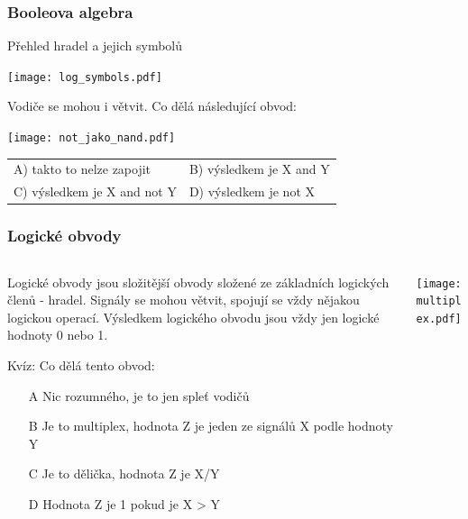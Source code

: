 \documentclass{beamer}
\begin{document}
\begin{frame}
\frametitle{Booleova algebra}

Přehled hradel a jejich symbolů
\begin{center}
   \texttt{[image: log\_symbols.pdf]}
\end{center}

Vodiče se mohou i větvit. Co dělá následující obvod:
\begin{center}
   \texttt{[image: not\_jako\_nand.pdf]}
\end{center}

\begin{tabular}{ll}
A) takto to nelze zapojit \phantom{XXXX} & B) výsledkem je X and Y\\
C) výsledkem je X and not Y              & D) výsledkem je not X
\end{tabular}
\end{frame}



\begin{frame}
\frametitle{Logické obvody}

\begin{columns}
\begin{column}{0.55\textwidth}
Logické obvody jsou složitější obvody složené ze základních logických členů - hradel. Signály se mohou větvit, spojují se vždy nějakou logickou operací.
Výsledkem logického obvodu jsou vždy jen logické hodnoty 0 nebo 1.

\bigskip

Kvíz: Co dělá tento obvod:
\begin{itemize}
\item[A] Nic rozumného, je to jen spleť vodičů
\item[B] Je to multiplex, hodnota Z je jeden ze signálů X podle hodnoty Y
\item[C] Je to dělička, hodnota Z je X/Y
\item[D] Hodnota Z je 1 pokud je X > Y 
\end{itemize}
\end{column}
\begin{column}{0.45\textwidth}  
\begin{center}
   \texttt{[image: multiplex.pdf]}
\end{center}
\end{column}
\end{columns}


\end{frame}
\end{document}
